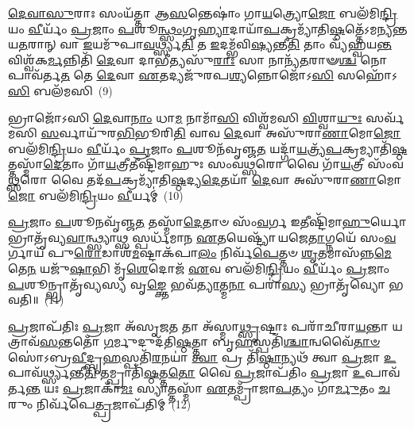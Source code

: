 {\anuvakamend[{\-\ul{𑌇}\-\-\ul{𑌨𑍍𑌦𑍍𑌰𑌿}\-𑌯𑌾𑌵᳴\-\ul{𑌤𑍀} 𑌭𑍂𑌤𑍍𑌯𑌾᳴ \ul{𑌉}\-𑌤𑍈\-\ul{𑌕𑌾}\-𑌨𑍍𑌨𑌪᳴\-\ul{𑌞𑍍𑌚𑌾}\-𑌶𑌚𑍍𑌚᳴}]}%

\-\ul{𑌦𑍇}\-\-\ul{𑌵𑌾}\-\-\ul{𑌸𑍁}\-𑌰𑌾𑌃 𑌸𑌂𑌯᳴𑌤𑍍𑌤𑌾 𑌆\-\ul{𑌸}\-𑌨𑍍𑌤𑍇𑌷𑌾𑌂॑ 𑌗𑌾\-\ul{𑌯}\-𑌤𑍍𑌰𑍍𑌯𑍋\-\ul{𑌜𑍋} 𑌬𑌲᳴𑌮𑌿\-\ul{𑌨𑍍𑌦𑍍𑌰𑌿}\-𑌯𑌂 \ul{𑌵𑍀}\-𑌰𑍍𑌯𑌂᳴ \ul{𑌪𑍍𑌰}\-𑌜𑌾𑌂 \ul{𑌪}\-𑌶𑍂\-\ul{𑌨𑍍𑌥𑍍𑌸𑌂}\-𑌗𑍃\-\ul{𑌹𑍍𑌯𑌾}\-𑌦𑌾𑌯𑌾᳴\-\ul{𑌪}\-𑌕𑍍𑌰𑌮𑍍𑌯𑌾᳴𑌤𑌿\-\ul{𑌷𑍍𑌠}\-𑌤𑍍𑌤𑍇᳴\-𑌽𑌮𑌨𑍍𑌯𑌨𑍍𑌤 𑌯\-\ul{𑌤}\-𑌰𑌾𑌨𑍍 𑌵𑌾 \ul{𑌇}\-𑌯𑌮𑍁᳴𑌪𑌾\-\ul{𑌵}\-𑌰𑍍𑌥𑍍𑌸𑍍𑌯\-\ul{𑌤𑌿} 𑌤 \ul{𑌇}\-𑌦𑌮𑍍𑌭᳴𑌵𑌿\-\ul{𑌷𑍍𑌯}\-𑌨𑍍𑌤𑍀\-\ul{𑌤𑌿} 𑌤𑌾𑌂 𑌵𑍍𑌯᳴𑌹𑍍𑌵𑌯\-\ul{𑌨𑍍𑌤} 𑌵𑌿𑌶𑍍𑌵᳴𑌕\-\ul{𑌰𑍍𑌮}\-𑌨𑍍𑌨𑌿𑌤𑌿᳴ \ul{𑌦𑍇}\-𑌵𑌾 𑌦𑌾𑌭𑍀𑌤𑍍𑌯𑌸𑍁᳴\-\ul{𑌰𑌾𑌃} 𑌸𑌾 𑌨𑌾𑌨𑍍𑌯᳴\-\ul{𑌤}\-𑌰𑌾𑍟\-\ul{𑌶𑍍𑌚} 𑌨𑍋𑌪𑌾𑌵᳴𑌰𑍍𑌤\-\ul{𑌤} 𑌤𑍇 \ul{𑌦𑍇}\-𑌵𑌾 \ul{𑌏}\-𑌤𑌦𑍍𑌯𑌜𑍁᳴𑌰𑌪\-\ul{𑌶𑍍𑌯}\-𑌨𑍍𑌨𑍋𑌜𑍋᳴\-𑌽\-\ul{𑌸𑌿} 𑌸𑌹𑍋᳴\-𑌽\-\ul{𑌸𑌿} 𑌬𑌲᳴𑌮𑌸𑌿~(9)

𑌭𑍍𑌰𑌾𑌜𑍋᳴\-𑌽𑌸𑌿 \ul{𑌦𑍇}\-𑌵𑌾\-\ul{𑌨𑌾𑌂} 𑌧𑌾\-\ul{𑌮} 𑌨𑌾𑌮𑌾᳴\-\ul{𑌸𑌿} 𑌵𑌿𑌶𑍍𑌵᳴𑌮𑌸𑌿 \ul{𑌵𑌿}\-𑌶𑍍𑌵𑌾\-\ul{𑌯𑍁𑌃} 𑌸𑌰𑍍𑌵᳴𑌮𑌸𑌿 \ul{𑌸}\-𑌰𑍍𑌵𑌾𑌯𑍁᳴𑌰\-\ul{𑌭𑌿}\-𑌭𑍂𑌰𑌿\-\ul{𑌤𑌿} 𑌵𑌾𑌵 \ul{𑌦𑍇}\-𑌵𑌾 𑌅𑌸𑍁᳴𑌰𑌾\-\ul{𑌣𑌾}\-𑌮𑍋\-\ul{𑌜𑍋} 𑌬𑌲᳴𑌮𑌿\-\ul{𑌨𑍍𑌦𑍍𑌰𑌿}\-𑌯𑌂 \ul{𑌵𑍀}\-𑌰𑍍𑌯𑌂᳴ \ul{𑌪𑍍𑌰}\-𑌜𑌾𑌂 \ul{𑌪}\-𑌶𑍂𑌨᳴𑌵𑍃𑌞𑍍𑌜\-\ul{𑌤} 𑌯𑌦𑍍𑌗𑌾᳴\-\ul{𑌯}\-𑌤𑍍𑌰𑍍𑌯᳴\-\ul{𑌪}\-𑌕𑍍𑌰𑌮𑍍𑌯𑌾𑌤𑌿᳴\-\ul{𑌷𑍍𑌠}\-𑌤𑍍𑌤𑌸𑍍𑌮𑌾᳴\-\ul{𑌦𑍇}\-𑌤𑌾𑌂 𑌗𑌾᳴\-\ul{𑌯}\-𑌤𑍍𑌰𑍀𑌤𑍀𑌷𑍍𑌟𑌿᳴𑌮𑌾𑌹𑍁𑌃 𑌸𑌂𑌵\-\ul{𑌥𑍍𑌸}\-𑌰𑍋 𑌵𑍈 𑌗𑌾᳴\-\ul{𑌯}\-𑌤𑍍𑌰𑍀 𑌸𑌂᳴𑌵\-\ul{𑌥𑍍𑌸}\-𑌰𑍋 𑌵𑍈 𑌤𑌦᳴\-\ul{𑌪}\-𑌕𑍍𑌰𑌮𑍍𑌯𑌾᳴𑌤𑌿\-\ul{𑌷𑍍𑌠}\-𑌦𑍍𑌯\-\ul{𑌦𑍇}\-𑌤𑌯𑌾᳴ \ul{𑌦𑍇}\-𑌵𑌾 𑌅𑌸𑍁᳴𑌰𑌾\-\ul{𑌣𑌾}\-𑌮𑍋\-\ul{𑌜𑍋} 𑌬𑌲᳴𑌮𑌿\-\ul{𑌨𑍍𑌦𑍍𑌰𑌿}\-𑌯𑌂 \ul{𑌵𑍀}\-𑌰𑍍𑌯𑌮𑍍॑~(10)

\-\ul{𑌪𑍍𑌰}\-𑌜𑌾𑌂 \ul{𑌪}\-𑌶𑍂𑌨𑌵𑍃᳴𑌞𑍍𑌜\-\ul{𑌤} 𑌤𑌸𑍍𑌮𑌾᳴\-\ul{𑌦𑍇}\-𑌤𑌾𑍞 𑌸𑌂᳴\-\ul{𑌵}\-𑌰𑍍𑌗 𑌇𑌤𑍀𑌷𑍍𑌟𑌿᳴𑌮𑌾\-\ul{𑌹𑍁}\-𑌰𑍍𑌯𑍋 𑌭𑍍𑌰𑌾𑌤𑍃᳴𑌵𑍍𑌯\-\ul{𑌵𑌾}\-𑌨𑍍𑌥𑍍𑌸𑍍𑌯𑌾𑌥𑍍𑌸 𑌸𑍍𑌪𑌰𑍍𑌧᳴𑌮𑌾𑌨 \ul{𑌏}\-𑌤𑌯𑍇𑌷𑍍𑌟𑍍𑌯𑌾᳴ 𑌯𑌜𑍇\-\ul{𑌤𑌾}\-𑌗𑍍𑌨𑌯𑍇᳴ 𑌸𑌂\-\ul{𑌵}\-𑌰𑍍𑌗𑌾𑌯᳴ 𑌪𑍁\-\ul{𑌰𑍋}\-𑌡𑌾𑌶᳴\-\-\ul{𑌮}\-𑌷𑍍𑌟𑌾\-𑌕᳴𑌪𑌾\-\ul{𑌲𑌂} 𑌨𑌿𑌰𑍍𑌵᳴\-\ul{𑌪𑍇}\-𑌤𑍍𑌤𑍞 \ul{𑌶𑍃}\-𑌤𑌮𑌾𑌸᳴𑌨𑍍𑌨\-\ul{𑌮𑍇}\-𑌤𑍇\-\ul{𑌨} 𑌯𑌜𑍁᳴\-\ul{𑌷𑌾}\-𑌭𑌿 𑌮𑍃᳴\-\ul{𑌶𑍇}\-𑌦𑍋𑌜᳴ \ul{𑌏}\-𑌵 𑌬𑌲᳴𑌮𑌿\-\ul{𑌨𑍍𑌦𑍍𑌰𑌿}\-𑌯𑌂 \ul{𑌵𑍀}\-𑌰𑍍𑌯𑌂᳴ \ul{𑌪𑍍𑌰}\-𑌜𑌾𑌂 \ul{𑌪}\-𑌶𑍂𑌨𑍍𑌭𑍍𑌰𑌾𑌤𑍃᳴𑌵𑍍𑌯𑌸𑍍𑌯 𑌵𑍃\-\ul{𑌙𑍍𑌕𑍍𑌤𑍇} 𑌭𑌵᳴\-\ul{𑌤𑍍𑌯𑌾}\-𑌤𑍍𑌮\-\ul{𑌨𑌾} 𑌪𑌰𑌾॑\-\ul{𑌸𑍍𑌯} 𑌭𑍍𑌰𑌾𑌤𑍃᳴𑌵𑍍𑌯𑍋 𑌭𑌵𑌤𑌿॥~(11)

{\anuvakamend[{𑌬𑌲᳴𑌮\-\ul{𑌸𑍍𑌯𑍇}\-𑌤𑌯𑌾᳴ \ul{𑌦𑍇}\-𑌵𑌾 𑌅𑌸𑍁᳴𑌰𑌾\-\ul{𑌣𑌾}\-𑌮𑍋\-\ul{𑌜𑍋} 𑌬𑌲᳴𑌮𑌿\-\ul{𑌨𑍍𑌦𑍍𑌰𑌿}\-𑌯𑌂 \ul{𑌵𑍀}\-𑌰𑍍𑌯𑌂᳴ 𑌪𑌞𑍍𑌚᳴𑌚𑌤𑍍𑌵𑌾𑌰𑌿𑍞𑌶𑌚𑍍𑌚}]}%

\-\ul{𑌪𑍍𑌰}\-𑌜𑌾𑌪᳴𑌤𑌿𑌃 \ul{𑌪𑍍𑌰}\-𑌜𑌾 𑌅᳴𑌸𑍃𑌜\-\ul{𑌤} 𑌤𑌾 𑌅᳴𑌸𑍍𑌮𑌾\-\ul{𑌥𑍍𑌸𑍃}\-𑌷𑍍𑌟𑌾𑌃 𑌪𑌰𑌾᳴𑌚𑍀𑌰𑌾\-\ul{𑌯}\-𑌨𑍍𑌤𑌾 𑌯𑌤𑍍𑌰𑌾𑌵᳴\-\ul{𑌸}\-𑌨𑍍𑌤𑌤𑍋᳴ \ul{𑌗}\-𑌰𑍍𑌮𑍁𑌦𑍁𑌦᳴𑌤𑌿\-\ul{𑌷𑍍𑌠}\-𑌤𑍍𑌤𑌾 𑌬𑍃\-\ul{𑌹}\-𑌸𑍍𑌪𑌤𑌿᳴\-\ul{𑌶𑍍𑌚𑌾}\-𑌨𑍍𑌵𑌵𑍈᳴\-\ul{𑌤𑌾}\-\-\ul{𑍞} 𑌸𑍋॑\-𑌽𑌬𑍍𑌰\-\ul{𑌵𑍀}\-𑌦𑍍𑌬𑍃\-\ul{𑌹}\-𑌸𑍍𑌪𑌤𑌿᳴\-\ul{𑌰}\-𑌨𑌯𑌾॑ \ul{𑌤𑍍𑌵𑌾} 𑌪𑍍𑌰 𑌤𑌿᳴\-\ul{𑌷𑍍𑌠𑌾}\-𑌨𑍍𑌯𑌥᳴ 𑌤𑍍𑌵𑌾 \ul{𑌪𑍍𑌰}\-𑌜𑌾 \ul{𑌉}\-𑌪𑌾𑌵᳴\-\ul{𑌰𑍍𑌥𑍍𑌸𑍍𑌯}\-𑌨𑍍𑌤𑍀\-\ul{𑌤𑌿} 𑌤𑌮𑍍𑌪𑍍𑌰𑌾𑌤𑌿᳴\-\ul{𑌷𑍍𑌠}\-𑌤𑍍𑌤\-\ul{𑌤𑍋} 𑌵𑍈 \ul{𑌪𑍍𑌰}\-𑌜𑌾𑌪᳴𑌤𑌿𑌂 \ul{𑌪𑍍𑌰}\-𑌜𑌾 \ul{𑌉}\-𑌪𑌾𑌵᳴𑌰𑍍𑌤\-\ul{𑌨𑍍𑌤} 𑌯𑌃 \ul{𑌪𑍍𑌰}\-𑌜𑌾𑌕𑌾᳴\-\ul{𑌮𑌃} 𑌸𑍍𑌯𑌾𑌤𑍍𑌤𑌸𑍍𑌮𑌾᳴ \ul{𑌏}\-𑌤𑌮𑍍𑌪𑍍𑌰𑌾᳴𑌜𑌾\-\ul{𑌪}\-𑌤𑍍𑌯𑌂 𑌗𑌾॑\-\ul{𑌰𑍍𑌮𑍁}\-𑌤𑌂 \ul{𑌚}\-𑌰𑍁𑌂 𑌨𑌿𑌰𑍍𑌵᳴𑌪𑍇\-\ul{𑌤𑍍𑌪𑍍𑌰}\-𑌜𑌾𑌪᳴𑌤𑌿𑌮𑍍~(12)

